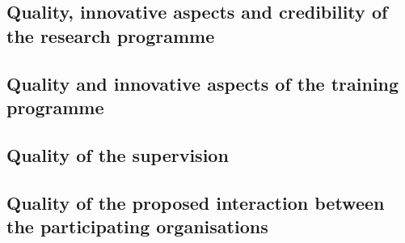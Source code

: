 \documentclass[11pt,a4paper]{article}
\begin{document}
\subsection{Quality, innovative aspects and credibility of the research programme}

\processdelayedfloats
%
%
\subsection{Quality and innovative aspects of the training programme}
\label{sec:training}
\label{sub:trainingOverview}

\processdelayedfloats
%
%
\vspace{-2mm}
\subsection{Quality of the supervision}
\label{sec:supervision}

\processdelayedfloats
%
%
%
\subsection{Quality of the proposed interaction between the participating organisations}

\label{sec:qualityInteraction}
\processdelayedfloats
%
%
\vspace{-2mm}
\end{document}
